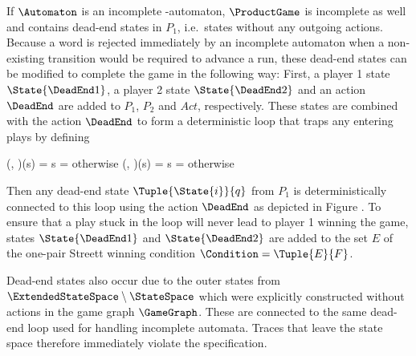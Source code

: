 \startsubsection[title={Dead-End States},reference=sec:abstraction-product-deadends]


    If $\Automaton$ is an incomplete \omega-automaton, $\ProductGame$ is incomplete as well and contains dead-end states in $P_1$, i.e.\ states without any outgoing actions.
    Because a word is rejected immediately by an incomplete automaton when a non-existing transition would be required to advance a run, these dead-end states can be modified to complete the game in the following way:
    First, a player 1 state $\State{\DeadEnd1}$, a player 2 state $\State{\DeadEnd2}$ and an action $\DeadEnd$ are added to $P_1$, $P_2$ and $Act$, respectively.
    These states are combined with the action $\DeadEnd$ to form a deterministic loop that traps any entering plays by defining

    \startformula
        \startalign[n=2,align={right,left}]
            \NC \Transition(, \DeadEnd)(s) =
            \NC \startmathcases
                    \MC \StartIf s = 
                    \NR
                    \NC otherwise
                    \NR
                \stopmathcases \EndAnd
            \NR
            \NC \Transition(, \DeadEnd)(s) =
            \NC \startmathcases
                    \MC \StartIf s = 
                    \NR
                    \NC otherwise
                    \NR
                \stopmathcases \EndPeriod
            \NR
        \stopalign
    \stopformula

    Then any dead-end state $\Tuple{\State{i}}{q}$ from $P_1$ is deterministically connected to this loop using the action $\DeadEnd$ as depicted in Figure .
    To ensure that a play stuck in the loop will never lead to player 1 winning the game, states $\State{\DeadEnd1}$ and $\State{\DeadEnd2}$ are added to the set $E$ of the one-pair Streett winning condition $\Condition = \Tuple{E}{F}$.

    Dead-end states also occur due to the outer states from $\ExtendedStateSpace \setminus \StateSpace$ which were explicitly constructed without actions in the game graph $\GameGraph$.
    These are connected to the same dead-end loop used for handling incomplete automata.
    Traces that leave the state space therefore immediately violate the specification.

